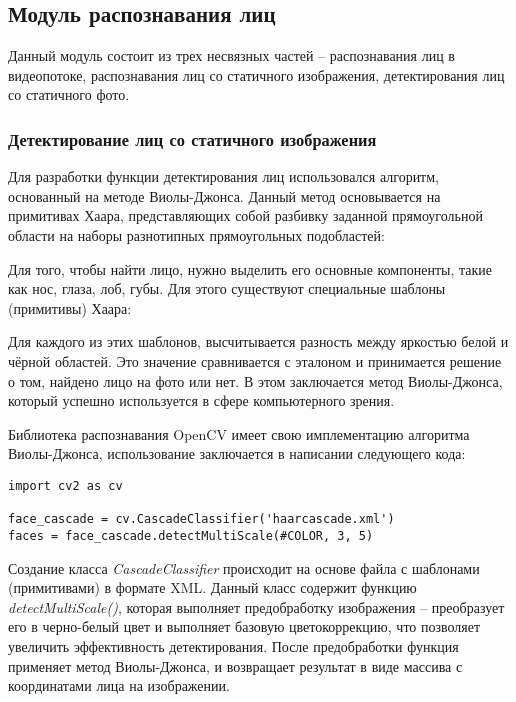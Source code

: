 \subsection{Модуль распознавания лиц}

Данный модуль состоит из трех несвязных частей -- распознавания лиц
в видеопотоке, распознавания лиц со статичного изображения, детектирования лиц
со статичного фото.

\subsubsection{Детектирование лиц со статичного изображения}

Для разработки функции детектирования лиц использовался алгоритм, основанный на
методе Виолы-Джонса. Данный метод основывается на примитивах Хаара,
представляющих собой разбивку заданной прямоугольной области на наборы
разнотипных прямоугольных подобластей:


Для того, чтобы найти лицо, нужно выделить его основные компоненты, такие как
нос, глаза, лоб, губы. Для этого существуют специальные шаблоны (примитивы)
Хаара:


Для каждого из этих шаблонов, высчитывается разность между яркостью белой
и чёрной областей. Это значение сравнивается с эталоном и принимается решение
о том, найдено лицо на фото или нет. В этом заключается метод Виолы-Джонса,
который успешно используется в сфере компьютерного зрения.


Библиотека распознавания OpenCV имеет свою имплементацию алгоритма
Виолы-Джонса, использование заключается в написании следующего кода:

\lstset{language=Python, basicstyle=\normalsize, numbers=left, breaklines=true,
frame=single, showstringspaces=false, columns=fullflexible} 
\begin{lstlisting}
import cv2 as cv

face_cascade = cv.CascadeClassifier('haarcascade.xml')
faces = face_cascade.detectMultiScale(#COLOR, 3, 5)
\end{lstlisting}

Создание класса \textit{CascadeClassifier} происходит на основе файла с шаблонами
(примитивами) в формате XML. Данный класс содержит функцию
\textit{detectMultiScale()}, которая выполняет предобработку изображения --
преобразует его в черно-белый цвет и выполняет базовую цветокоррекцию, что
позволяет увеличить эффективность детектирования. После предобработки функция
применяет метод Виолы-Джонса, и возвращает результат в виде массива
с координатами лица на изображении. 
